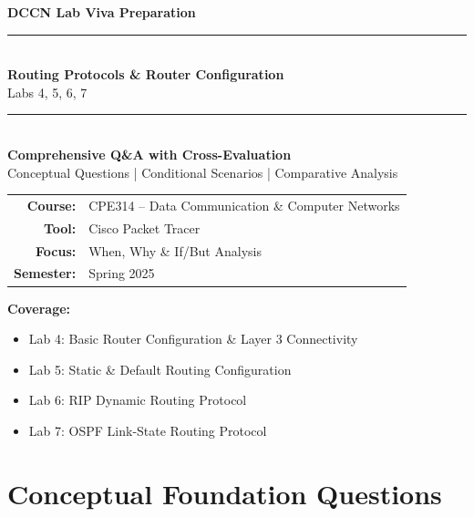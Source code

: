 \documentclass[12pt,a4paper]{article}
\begin{document}

\begin{titlepage}
\centering
\vspace*{1cm}
{\Large\color{primary}\textbf{DCCN Lab Viva Preparation}}\\[0.3cm]
\rule{\textwidth}{2pt}\\[0.5cm]
{\Huge\bfseries\color{primary} Routing Protocols \& Router Configuration}\\[0.2cm]
{\Large Labs 4, 5, 6, 7}\\[0.3cm]
\rule{\textwidth}{2pt}\\[1.5cm]

{\Large\bfseries Comprehensive Q\&A with Cross-Evaluation}\\[0.3cm]
{\normalsize Conceptual Questions | Conditional Scenarios | Comparative Analysis}

\vfill

\begin{tabular}{rl}
\textbf{Course:} & CPE314 -- Data Communication \& Computer Networks \\[0.2cm]
\textbf{Tool:} & Cisco Packet Tracer \\[0.2cm]
\textbf{Focus:} & When, Why \& If/But Analysis \\[0.2cm]
\textbf{Semester:} & Spring 2025 \\
\end{tabular}

\vfill
{\large \textcolor{primary}{\textbf{Coverage:}}}
\begin{itemize}[noitemsep]
    \item Lab 4: Basic Router Configuration \& Layer 3 Connectivity
    \item Lab 5: Static \& Default Routing Configuration
    \item Lab 6: RIP Dynamic Routing Protocol
    \item Lab 7: OSPF Link-State Routing Protocol
\end{itemize}

\end{titlepage}

\tableofcontents
\newpage

\section{Conceptual Foundation Questions}
\end{document}
